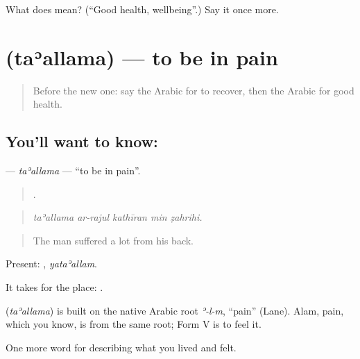 \begin{tcolorbox}[breakable,colback=teal!4,colframe=teal!35!black,title={Before you move on}]
What does  mean? (\textquotedblleft{}Good health, wellbeing\textquotedblright{}.) Say it once more.
\end{tcolorbox}
\section[\texorpdfstring{\ar{تألم} (taʾallama)}{تألم (taʾallama)}]{ (taʾallama) — to be in pain}

\label{lesson:AR-C512-taallama-pain}



\begin{quote}
Before the new one: say the Arabic for to recover, then the Arabic for good health.
\end{quote}

\subsection*{You'll want to know: }
\textbf{} — \emph{taʾallama} — \textquotedblleft{}to be in pain\textquotedblright{}.

\begin{quote}
    .
\end{quote}

\begin{quote}
\emph{taʾallama ar-rajul kathīran min ẓahrihi.}
\end{quote}

\begin{quote}
The man suffered a lot from his back.
\end{quote}

Present: , \emph{yataʾallam}.

It takes  for the place:   .

\begin{cousinweb}
\textbf{} (\emph{taʾallama}) is built on the native Arabic root \emph{ʾ-l-m}, \textquotedblleft{}pain\textquotedblright{} (Lane). Alam, pain, which you know, is from the same root; Form V is to feel it.
\end{cousinweb}

\begin{grammarlens}[title={What you've built}]
One more word for describing what you lived and felt.
\end{grammarlens}

